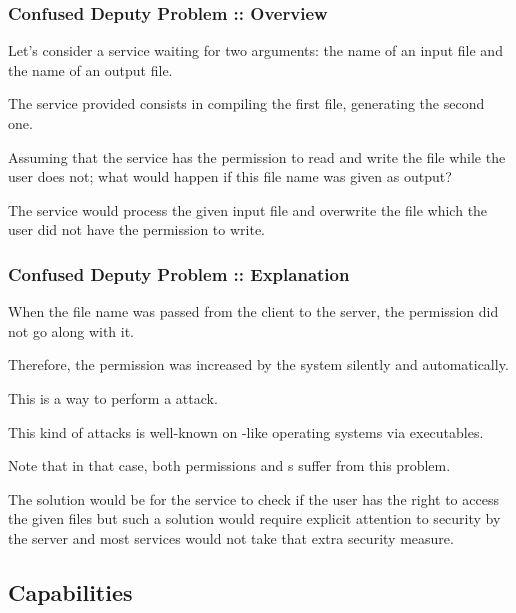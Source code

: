 
\begin{frame}
  \frametitle{Confused Deputy Problem :: Overview}

  Let's consider a service waiting for two arguments: the name of an input
  file and the name of an output file.

  \-

  The service provided consists in compiling the first file, generating the
  second one.

  \-

  Assuming that the service has the permission to read and write the
   file while the user does not; what would happen
  if this file name was given as output?

  \-

  The service would process the given input file and overwrite the
   file which the user did not have the permission
  to write.
\end{frame}


\begin{frame}
  \frametitle{Confused Deputy Problem :: Explanation}

  When the file name was passed from the client to the server, the permission
  did not go along with it.

  \-

  Therefore, the permission was increased by the system silently and
  automatically.

  \-

  This is a way to perform a  attack.

  \-

  This kind of attacks is well-known on -like operating systems
  via  executables.

  \-

  Note that in that case, both  permissions and s
  suffer from this problem.

  \-

  The solution would be for the service to check if the user has the right to
  access the given files but such a solution would require explicit attention
  to security by the server and most services would not take that extra
  security measure.
\end{frame}


\subsection{Capabilities}

